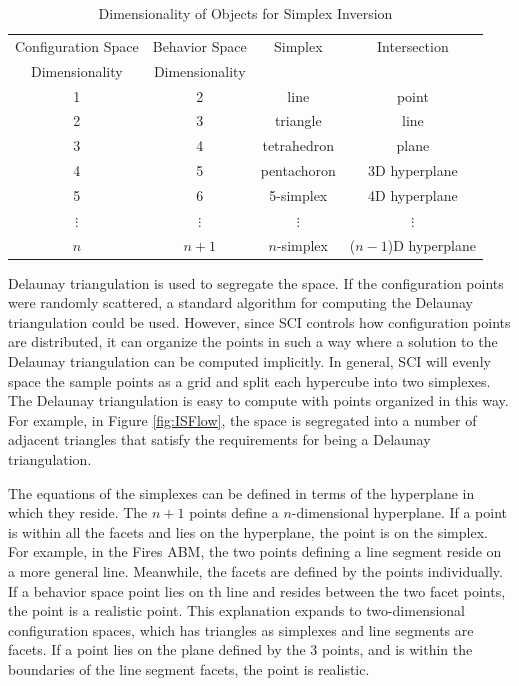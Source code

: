 \begin{table}[ht]
  \caption{Dimensionality of Objects for Simplex Inversion}
  \centering
  \begin{tabular}{c c c c}
    \hline \hline
    Configuration Space & Behavior Space & Simplex & Intersection \\
    Dimensionality      & Dimensionality &         &  \\
    \hline
    1 & 2 & line & point \\
    2 & 3 & triangle & line \\
    3 & 4 & tetrahedron & plane \\
    4 & 5 & pentachoron & 3D hyperplane \\
    5 & 6 & 5-simplex & 4D hyperplane \\
    $\vdots$ & $\vdots$ & $\vdots$ & $\vdots$ \\
    $n$ & $n + 1$ & $n$-simplex & ($n-1$)D hyperplane \\
    \hline
  \end{tabular}
  \label{table:dims}
\end{table}

Delaunay triangulation is used to segregate the space.
If the configuration points were randomly scattered, a standard algorithm for computing the Delaunay triangulation could be used.
However, since SCI controls how configuration points are distributed, it can organize the points in such a way where a solution to the Delaunay triangulation can be computed implicitly.
In general, SCI will evenly space the sample points as a grid and split each hypercube into two simplexes.
The Delaunay triangulation is easy to compute with points organized in this way.
For example, in Figure \ref{fig:ISFlow}, the space is segregated into a number of adjacent triangles that satisfy the requirements for being a Delaunay triangulation.

The equations of the simplexes can be defined in terms of the hyperplane in which they reside.
The $n+1$ points define a $n$-dimensional hyperplane.
If a point is within all the facets and lies on the hyperplane, the point is on the simplex.
For example, in the Fires ABM, the two points defining a line segment reside on a more general line.
Meanwhile, the facets are defined by the points individually.
If a behavior space point lies on th line and resides between the two facet points, the point is a realistic point.
This explanation expands to two-dimensional configuration spaces, which has triangles as simplexes and line segments are facets.
If a point lies on the plane defined by the 3 points, and is within the boundaries of the line segment facets, the point is realistic.


